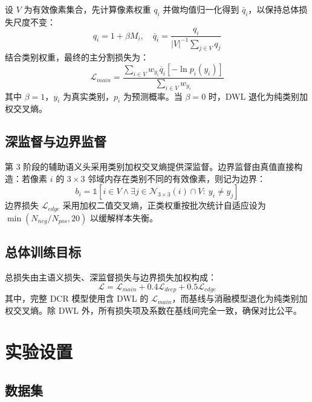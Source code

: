 \documentclass[10pt,conference]{IEEEtran}
\begin{document}
设 \(V\) 为有效像素集合，先计算像素权重 \(q_i\) 并做均值归一化得到 \(\bar{q}_i\)，以保持总体损失尺度不变：
\begin{equation}
q_{i}=1+\beta M_{i},\quad \bar{q}_{i}=\frac{q_{i}}{{\left|V\right|}^{-1}\sum_{j\in V} q_{j}}
\end{equation}
结合类别权重，最终的主分割损失为：
\begin{equation}
\mathcal{L}_{main}=\frac{\sum_{i\in V} w_{y_{i}}\bar{q}_{i}\left[-\ln{p}_{i}\left(y_{i}\right)\right]}{\sum_{i\in V} w_{y_{i}}}
\end{equation}
其中 \(\beta=1\)，\(y_i\) 为真实类别，\(p_i\) 为预测概率。当 \(\beta=0\) 时，DWL 退化为纯类别加权交叉熵。

\subsection{深监督与边界监督}

第 3 阶段的辅助语义头采用类别加权交叉熵提供深监督。边界监督由真值直接构造：若像素 \(i\) 的 \(3\times3\) 邻域内存在类别不同的有效像素，则记为边界：
\begin{equation}
b_{i}=\mathbb{1}\left[i\in V \wedge \exists j\in \mathcal{N}_{3\times 3}\left(i\right)\cap V:\ y_{i}\neq y_{j}\right]
\end{equation}
边界损失 \(\mathcal{L}_{edge}\) 采用加权二值交叉熵，正类权重按批次统计自适应设为 \(\min{\left(N_{neg}/N_{pos},20\right)}\) 以缓解样本失衡。

\subsection{总体训练目标}

总损失由主语义损失、深监督损失与边界损失加权构成：
\begin{equation}
\mathcal{L}={\mathcal{L}}_{main}+0.4{\mathcal{L}}_{deep}+0.5{\mathcal{L}}_{edge}
\end{equation}
其中，完整 DCR 模型使用含 DWL 的 \(\mathcal{L}_{main}\)，而基线与消融模型退化为纯类别加权交叉熵。除 DWL 外，所有损失项及系数在基线间完全一致，确保对比公平。


\section{实验设置}

\subsection{数据集}
\end{document}

